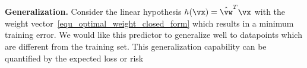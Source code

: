 \documentclass[12pt]{report}
\begin{document}
{\bf Generalization.}
Consider the linear hypothesis $h(\vx) = \hat{\vw}^{T} \vx$ with the weight 
vector \eqref{equ_optimal_weight_closed_form} which results in a minimum 
training error. We would like this predictor to generalize well to datapoints 
which are different from the training set. This generalization capability can 
be quantified by the expected loss or risk %
%
%
\end{document}
